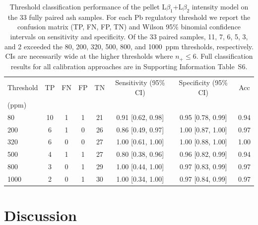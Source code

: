 \documentclass[
  journal=esthag,        %
  manuscript=article,    %
  layout=onecolumn       %
]{achemso}
\begin{document}
\begin{table}[htbp]
\caption{Threshold classification performance of the pellet L$\beta_{1}$+L$\beta_{2}$ intensity model on the 33 fully paired ash samples. For each Pb regulatory threshold we report the confusion matrix (TP, FN, FP, TN) and Wilson 95\% binomial confidence intervals on sensitivity and specificity. Of the 33 paired samples, 11, 7, 6, 5, 3, and 2 exceeded the 80, 200, 320, 500, 800, and 1000~ppm thresholds, respectively. CIs are necessarily wide at the higher thresholds where $n_+ \leq 6$. Full classification results for all calibration approaches are in Supporting Information Table~S6.}
\label{tab:threshold_classification}
\centering
\small
\begin{tabular}{l c c c c c c c}
\toprule
Threshold & TP & FN & FP & TN & Sensitivity (95\% CI) & Specificity (95\% CI) & Acc \\
(ppm)     &    &    &    &    &                       &                       &     \\
\midrule
80   & 10 & 1 & 1 & 21 & 0.91 [0.62, 0.98] & 0.95 [0.78, 0.99] & 0.94 \\
200  & 6 & 1 & 0 & 26 & 0.86 [0.49, 0.97] & 1.00 [0.87, 1.00] & 0.97 \\
320  & 6 & 0 & 0 & 27 & 1.00 [0.61, 1.00] & 1.00 [0.88, 1.00] & 1.00 \\
500  & 4 & 1 & 1 & 27 & 0.80 [0.38, 0.96] & 0.96 [0.82, 0.99] & 0.94 \\
800  & 3 & 0 & 1 & 29 & 1.00 [0.44, 1.00] & 0.97 [0.83, 0.99] & 0.97 \\
1000 & 2 & 0 & 1 & 30 & 1.00 [0.34, 1.00] & 0.97 [0.84, 0.99] & 0.97 \\
\bottomrule
\end{tabular}
\end{table}
\section{Discussion}
\end{document}
